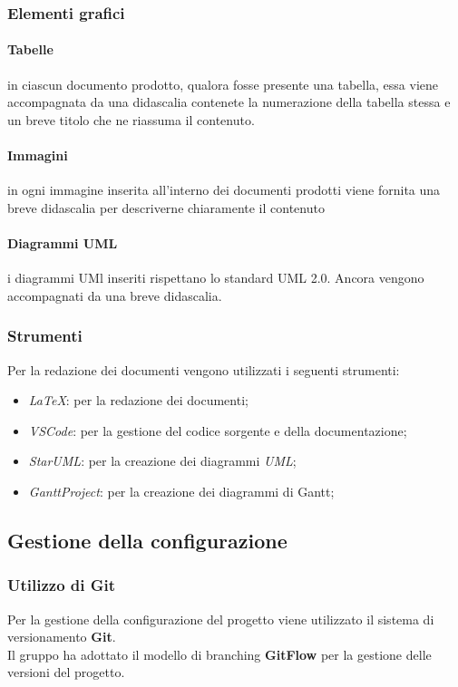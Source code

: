 \subsubsection{Elementi grafici}
\paragraph{Tabelle} in ciascun documento prodotto, qualora fosse presente una tabella, essa viene accompagnata da una didascalia contenete la numerazione della tabella stessa e un breve titolo che ne riassuma il contenuto.\\

\paragraph{Immagini} in ogni immagine inserita all'interno dei documenti prodotti viene fornita una breve didascalia per descriverne chiaramente il contenuto

\paragraph{Diagrammi UML} i diagrammi UMl inseriti rispettano lo standard UML 2.0. Ancora vengono accompagnati da una breve didascalia.

\subsubsection{Strumenti}
Per la redazione dei documenti vengono utilizzati i seguenti strumenti:
\begin{itemize}
    \item \textit{LaTeX}: per la redazione dei documenti;
    \item \textit{VSCode}: per la gestione del codice sorgente e della documentazione;
    \item \textit{StarUML}: per la creazione dei diagrammi \textit{UML};
    \item \textit{GanttProject}: per la creazione dei diagrammi di Gantt;
\end{itemize}

\subsection{Gestione della configurazione}

\subsubsection{Utilizzo di Git}
Per la gestione della configurazione del progetto viene utilizzato il sistema di versionamento \textbf{Git}.\\
Il gruppo ha adottato il modello di branching \textbf{GitFlow} per la gestione delle versioni del progetto.\\


